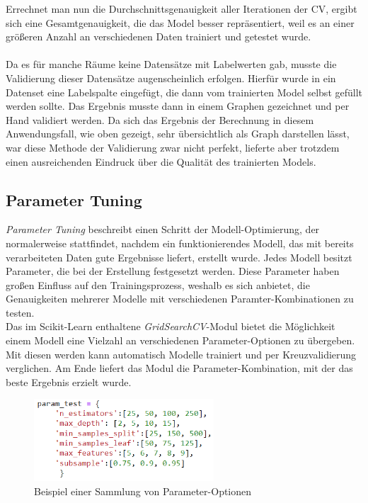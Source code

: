 Errechnet man nun die Durchschnittsgenauigkeit aller Iterationen der CV, ergibt sich eine Gesamtgenauigkeit, 
die das Model besser repräsentiert, weil es an einer größeren Anzahl an verschiedenen Daten trainiert und 
getestet wurde.
\\\\
Da es für manche Räume keine Datensätze mit Labelwerten gab, musste die Validierung dieser Datensätze 
augenscheinlich erfolgen. Hierfür wurde in ein Datenset eine Labelspalte eingefügt, die dann vom trainierten
Model selbst gefüllt werden sollte. Das Ergebnis musste dann in einem Graphen gezeichnet und per Hand validiert 
werden. Da sich das Ergebnis der Berechnung in diesem Anwendungsfall, wie oben gezeigt, sehr übersichtlich als 
Graph darstellen lässt, war diese Methode der Validierung zwar nicht perfekt, lieferte aber trotzdem einen 
ausreichenden Eindruck über die Qualität des trainierten Models.

\subsection{Parameter Tuning}
\textit{Parameter Tuning} beschreibt einen Schritt der Modell-Optimierung, der normalerweise stattfindet, 
nachdem ein funktionierendes Modell, das mit bereits verarbeiteten Daten gute Ergebnisse liefert, erstellt 
wurde. Jedes Modell besitzt Parameter, die bei der Erstellung festgesetzt werden. Diese Parameter haben 
großen Einfluss auf den Trainingsprozess, weshalb es sich anbietet, die Genauigkeiten mehrerer Modelle 
mit verschiedenen Paramter-Kombinationen zu testen.\\
Das im Scikit-Learn enthaltene \textit{GridSearchCV}-Modul
bietet die Möglichkeit einem Modell eine Vielzahl an verschiedenen Parameter-Optionen zu übergeben. Mit diesen 
werden kann automatisch Modelle trainiert und per Kreuzvalidierung verglichen. Am Ende liefert das Modul 
die Parameter-Kombination, mit der das beste Ergebnis erzielt wurde.

\begin{figure}[h]
    \centering
    \includegraphics[width=0.6\textwidth]{pic/param_test.png}
    \caption{Beispiel einer Sammlung von Parameter-Optionen}
    \label{fig:CV}
\end{figure}

